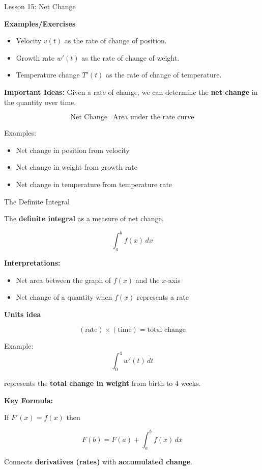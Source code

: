 \documentclass[dvipsnames]{beamer}
\begin{document}
\begin{frame}{Lesson 15: Net Change}

\textbf{Examples/Exercises}
\begin{itemize}
\item Velocity $v(t)$ as the rate of change of position.
\item Growth rate $w'(t)$ as the rate of change of weight.
\item Temperature change $T'(t)$ as the rate of change of temperature.
\end{itemize}

\bigskip

\textbf{Important Ideas:}
Given a rate of change, we can determine the \textbf{net change} in the quantity over time.

\[
\text{Net Change} = \text{Area under the rate curve}
\]

\bigskip

Examples:
\begin{itemize}
\item Net change in position from velocity
\item Net change in weight from growth rate
\item Net change in temperature from temperature rate
\end{itemize}

\end{frame}


\begin{frame}{The Definite Integral}

The \textbf{definite integral} as a measure of net change.

\[
\int_a^b f(x)\,dx
\]

\textbf{Interpretations:}

\begin{itemize}
\item Net area between the graph of $f(x)$ and the $x$-axis
\item Net change of a quantity when $f(x)$ represents a rate
\end{itemize}

\bigskip

\textbf{Units idea}

\[
(\text{rate}) \times (\text{time}) = \text{total change}
\]

Example:
\[
\int_0^4 w'(t)\,dt
\]

represents the \textbf{total change in weight} from birth to 4 weeks.

\bigskip
\end{frame}
\begin{frame}
\textbf{Key Formula:}

If $F'(x) = f(x)$ then

\[
F(b) = F(a) + \int_a^b f(x)\,dx
\]

Connects \textbf{derivatives (rates)} with \textbf{accumulated change}.

\end{frame}
\end{document}
